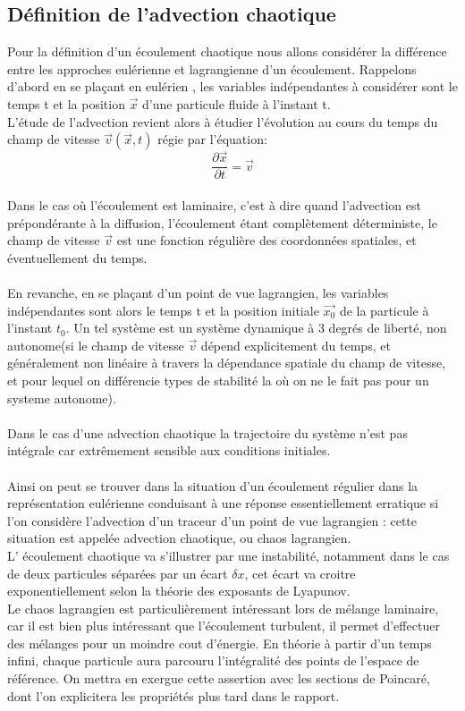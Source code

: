 \documentclass[a4paper,12pt,titlepage]{report}
\begin{document}
\begin{onehalfspace}
\subsection{Définition de l'advection chaotique}
Pour la définition d'un écoulement chaotique nous allons considérer la différence entre les approches eulérienne et lagrangienne d'un écoulement. 
 Rappelons  d'abord en se plaçant en eulérien , les variables indépendantes à considérer sont le temps t et la position $\vec{x}$ d'une particule fluide à l'instant t. \\
 L'étude de l'advection revient alors à étudier l'évolution au cours du temps du champ de vitesse $\vec{v}(\vec{x},t)$ régie par l'équation: 
 \[
 \frac{\partial \vec{x}}{\partial t}= \vec{v}
\]
\\
Dans le cas où l'écoulement est laminaire, c'est à dire quand l'advection est prépondérante à la diffusion, l'écoulement étant complètement déterministe, le champ de vitesse $\vec{v}$ est une fonction régulière des coordonnées spatiales, et éventuellement du temps. 
\\ 
\\
En revanche, en se plaçant d'un point de vue lagrangien, les variables indépendantes sont alors le temps t et la position initiale $\vec{x_0}$ de la particule à l'instant $t_0$. Un tel système est un système dynamique à 3 degrés de liberté, non autonome(si le champ de vitesse $\vec{v}$ dépend explicitement du temps, et généralement non linéaire à travers la dépendance spatiale du champ de vitesse, et pour lequel on différencie types de stabilité la où on ne le fait pas pour un systeme autonome). \\
\\
Dans le cas d'une advection chaotique la trajectoire du système n'est pas intégrale car extrêmement sensible aux conditions initiales.
\\
\\
Ainsi on peut se trouver dans la situation d'un écoulement régulier dans la représentation eulérienne conduisant à une réponse essentiellement erratique si l'on considère l'advection d'un traceur d'un point de vue lagrangien : cette situation est appelée advection chaotique, ou chaos lagrangien.\\
L' écoulement chaotique va s'illustrer par une instabilité, notamment dans le cas de deux particules séparées par un écart $\delta x$, cet écart va croitre exponentiellement selon la théorie des exposants de Lyapunov. 
\\
Le chaos lagrangien est particulièrement intéressant lors de mélange laminaire, car il est bien plus intéressant que l'écoulement turbulent, il permet d'effectuer des mélanges pour un moindre cout d'énergie. En théorie à partir d'un temps infini, chaque particule aura parcouru l'intégralité des points de l'espace de référence.  On mettra en exergue cette assertion avec les sections de Poincaré, dont l'on explicitera les propriétés plus tard dans le rapport. 


\end{onehalfspace}
\end{document}
